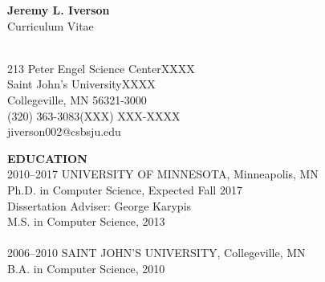 \documentclass[a4paper,12pt]{article}
\newcommand{\lskip}[1]{\hspace*{1em}\\[#1\baselineskip]}
\begin{document}
\begin{center}
{\large\textbf{Jeremy L. Iverson}}\\
Curriculum Vitae\\
\end{center}
%
\lskip{-3}
%
213 Peter Engel Science Center\hfill XXXX\\
Saint John's University\hfill XXXX\\
Collegeville, MN 56321-3000\hfill\\ %
(320) 363-3083\hfill (XXX) XXX-XXXX\\ %
jiverson002@csbsju.edu


\textbf{EDUCATION}
\lskip{1}
%
2010--2017  \tabto{7em}UNIVERSITY OF MINNESOTA, Minneapolis, MN\\
            \tabto{7em}Ph.D. in Computer Science, Expected Fall 2017\\
            \tabto{8em}Dissertation Adviser: George Karypis\\
            \tabto{7em}M.S. in Computer Science, 2013\\
%
\lskip{0}
%
2006--2010  \tabto{7em}SAINT JOHN'S UNIVERSITY, Collegeville, MN\\
            \tabto{7em}B.A. in Computer Science, 2010
\end{document}
